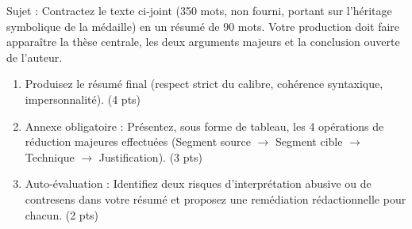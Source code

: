 \documentclass[11pt]{article}
\begin{document}
\begin{exercice}
Sujet : \og Contractez le texte ci-joint (350 mots, non fourni, portant sur l'héritage symbolique de la médaille) en un résumé de 90 mots. Votre production doit faire apparaître la thèse centrale, les deux arguments majeurs et la conclusion ouverte de l'auteur. \fg{}

\begin{enumerate}
    \item Produisez le résumé final (respect strict du calibre, cohérence syntaxique, impersonnalité). (4 pts)
    \item Annexe obligatoire : Présentez, sous forme de tableau, les 4 opérations de réduction majeures effectuées (Segment source $\rightarrow$ Segment cible $\rightarrow$ Technique $\rightarrow$ Justification). (3 pts)
    \item Auto-évaluation : Identifiez deux risques d'interprétation abusive ou de contresens dans votre résumé et proposez une remédiation rédactionnelle pour chacun. (2 pts)
\end{enumerate}
\end{exercice}
\end{document}
